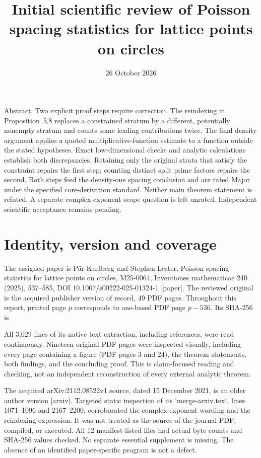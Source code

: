 \documentclass[10pt]{article}
\title{Initial scientific review of
Poisson spacing statistics for lattice points on circles}
\author{}
\date{26 October 2026}
\begin{document}
\maketitle
Abstract: Two explicit proof steps require correction. The reindexing in Proposition 5.8 replaces a constrained stratum by a different, potentially nonempty stratum and counts some leading contributions twice. The final density argument applies a quoted multiplicative-function estimate to a function outside the stated hypotheses. Exact low-dimensional checks and analytic calculations establish both discrepancies. Retaining only the original strata that satisfy the constraint repairs the first step; counting distinct split prime factors repairs the second. Both steps feed the density-one spacing conclusion and are rated Major under the specified core-derivation standard. Neither main theorem statement is refuted. A separate complex-exponent scope question is left unrated. Independent scientific acceptance remains pending.\par
\section*{Identity, version and coverage}
The assigned paper is Pär Kurlberg and Stephen Lester, Poisson spacing statistics for lattice points on circles, M25-0064, Inventiones mathematicae 240 (2025), 537–585, DOI 10.1007/s00222-025-01324-1 [paper]. The reviewed original is the acquired publisher version of record, 49 PDF pages. Throughout this report, printed page \(p\) corresponds to one-based PDF page \(p-536\). Its SHA-256 is\par
All 3,029 lines of its native text extraction, including references, were read continuously. Nineteen original PDF pages were inspected visually, including every page containing a figure (PDF pages 3 and 24), the theorem statements, both findings, and the concluding proof. This is claim-focused reading and checking, not an independent reconstruction of every external analytic theorem.\par
The acquired arXiv:2112.08522v1 source, dated 15 December 2021, is an older author version [arxiv]. Targeted static inspection of its `merge-arxiv.tex`, lines 1071–1096 and 2167–2200, corroborated the complex-exponent wording and the reindexing expression. It was not treated as the source of the journal PDF, compiled, or executed. All 12 manifest-listed files had actual byte counts and SHA-256 values checked. No separate essential supplement is missing. The absence of an identified paper-specific program is not a defect.\par
\end{document}
